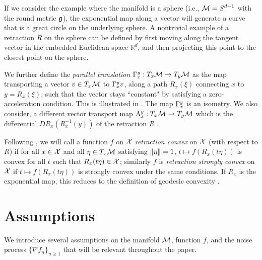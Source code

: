 If we consider the example where the manifold is a sphere (i.e., $\mathcal{M} = S^{d-1}$ with the round metric $\mathfrak{g}$), the exponential map along a vector will generate a curve that is a great circle on the underlying sphere. A nontrivial example of a retraction $R$ on the sphere can be defined by first moving along the tangent vector in the embedded Euclidean space $\mathbb{R}^d$, and then projecting this point to the closest point on the sphere.

We further define the \emph{parallel translation} $\Gamma_{x}^{y} : T_x \mathcal{M} \to T_y \mathcal{M}$ as the map
transporting a vector $v \in T_x \mathcal{M}$ to $\Gamma_{x}^{y} v$, along a path $R_{x}(\xi)$ connecting $x$ to $y = R_{x}(\xi)$, such that the vector stays ``constant" by satisfying a zero-acceleration condition. This is illustrated in . The map $\Gamma_{x}^{y}$ is an isometry. We also consider, a different vector transport map $\Lambda_{x}^{y}:T_x \mathcal{M} \to T_y \mathcal{M}$ which is the differential  $DR_{x}(R_x^{-1}(y))$ of the retraction $R$ \citep[][Sec.~8.1]{absil2009optimization}.

Following \citet{huang2015broyden}, we will call a function $f$ on $\mathcal{X}$ \emph{retraction convex} on $\mathcal{X}$ (with respect to $R$) if for all $x \in \mathcal{X}$ and all $\eta \in T_{x}\mathcal{M}$ satisfying $\norm{\eta}=1$, $t \mapsto f(R_{x}(t \eta))$ is convex for all $t$ such that $R_{x}(t \eta) \in \mathcal{X}$; similarly $f$ is \emph{retraction strongly convex} on $\mathcal{X}$ if $t \mapsto f(R_{x}(t \eta))$ is strongly convex under the same conditions. If $R_x$ is the exponential map, this reduces to the definition of geodesic convexity \citep[see the work of][for further details]{zhang2016first}.
\vspace{-1.21pt}
\section{Assumptions} \label{sec:assumptions}
\vspace{-1.22pt}
We introduce several assumptions on the manifold $\mathcal{M}$, function $f$, and the noise process $\{\nabla f_n\}_{n\geq1}$ that will be relevant throughout the paper.
\vspace*{-.1850cm}
